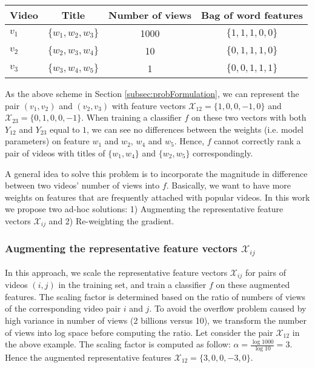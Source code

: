 	\begin{center}
		\begin{tabular}{| l | c | c | c |}
    			\hline
			Video & Title & Number of views & Bag of word features \\ \hline
			$v_1$ & $\{w_1, w_2, w_3\}$ &	1000 & $\{1, 1, 1, 0 ,0 \}$	\\ \hline
			$v_2$ & $\{w_2, w_3, w_4\}$ & 10 & $\{0, 1, 1, 1 ,0 \}$	\\ \hline
			$v_3$ & $\{w_3, w_4, w_5\}$ & 1 & $\{0, 0, 1, 1 ,1 \}$	\\ \hline
		\end{tabular}
	\end{center}

As the above scheme in Section \ref{subsec:probFormulation}, we can represent the pair $(v_1, v_2)$ and $(v_2, v_3)$ with feature vectors $\mathcal{X}_{12}=\{1, 0, 0, -1, 0\}$ and $\mathcal{X}_{23}=\{0, 1, 0, 0 , -1 \}$. When training a classifier $f$ on these two vectors with both $Y_{12}$ and $Y_{23}$ equal to $1$, we can see no differences between the weights (i.e. model parameters) on feature $w_1$ and $w_2$, $w_4$ and $w_5$. Hence, $f$ cannot correctly rank a pair of videos with titles of $\{w_1, w_4\}$ and $\{w_2, w_5\}$ correspondingly.

A general idea to solve this problem is to incorporate the magnitude in difference between two videos' number of views into $f$. Basically, we want to have more weights on features that are frequently attached with popular videos. In this work we propose two ad-hoc solutions: 1) Augmenting the representative feature vectors $\mathcal{X}_{ij}$ and 2) Re-weighting the gradient.

\subsubsection{Augmenting the representative feature vectors $\mathcal{X}_{ij}$}
In this approach, we scale the representative feature vectors $\mathcal{X}_{ij}$ for pairs of videos $(i, j)$ in the training set, and train a classifier $f$ on these augmented features. The scaling factor is determined based on the ratio of numbers of views of the corresponding video pair $i$ and $j$. To avoid the overflow problem caused by high variance in number of views (2 billions versus 10), we transform the number of views into log space before computing the ratio. Let consider the pair $\mathcal{X}_{12}$ in the above example. The scaling factor is computed as follow: $\alpha = \frac{\log 1000}{\log 10} = 3$. Hence the augmented representative features $\mathcal{X}_{12} = \{3, 0, 0, -3, 0\}$. 

